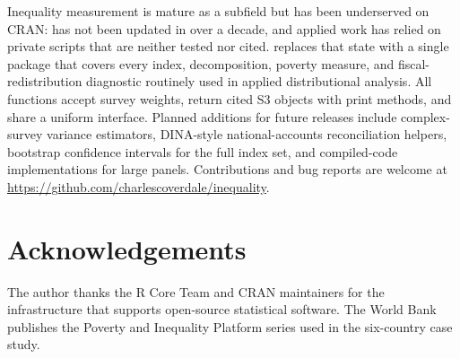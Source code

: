 Inequality measurement is mature as a subfield but has been
underserved on CRAN:  has not been updated in over a
decade, and applied work has relied on private scripts that are
neither tested nor cited.  replaces that state
with a single package that covers every index, decomposition,
poverty measure, and fiscal-redistribution diagnostic routinely used
in applied distributional analysis. All functions accept survey
weights, return cited S3 objects with print methods, and share a
uniform interface. Planned additions for future releases include
complex-survey variance estimators, DINA-style national-accounts
reconciliation helpers, bootstrap confidence intervals for the full
index set, and compiled-code implementations for large panels.
Contributions and bug reports are welcome at
\url{https://github.com/charlescoverdale/inequality}.

\section*{Acknowledgements}\label{acknowledgements}

The author thanks the R Core Team and CRAN maintainers for the
infrastructure that supports open-source statistical software. The
World Bank publishes the Poverty and Inequality Platform series used
in the six-country case study.



\address{%
Charles Coverdale\\
Independent\\%
London, United Kingdom\\
%
\url{https://github.com/charlescoverdale/inequality}\\%
%
\href{mailto:charles.f.coverdale@gmail.com}{\nolinkurl{charles.f.coverdale@gmail.com}}%
}
